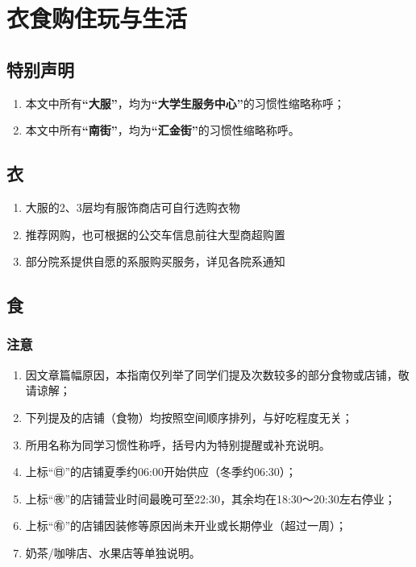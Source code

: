 \section[衣食购住玩与生活]{衣食购住玩与生活}

\subsection*{特别声明}
\begin{enumerate}
    \item 本文中所有\textbf{“大服”}，均为\textbf{“大学生服务中心”}的习惯性缩略称呼；
    \item 本文中所有\textbf{“南街”}，均为\textbf{“汇金街”}的习惯性缩略称呼。
\end{enumerate}
\subsection[衣]{衣}
\begin{enumerate}
    \item 大服的2、3层均有服饰商店可自行选购衣物
    \item 推荐网购，也可根据的公交车信息前往大型商超购置
    \item 部分院系提供自愿的系服购买服务，详见各院系通知
\end{enumerate}

\subsection[食]{食}
\subsubsection*{注意}
\begin{enumerate}
    \item 因文章篇幅原因，本指南仅列举了同学们提及次数较多的部分食物或店铺，敬请谅解；
    \item 下列提及的店铺（食物）均按照空间顺序排列，与好吃程度无关；
    \item 所用名称为同学习惯性称呼，括号内为特别提醒或补充说明。
    \item 上标“㊐”的店铺夏季约06:00开始供应（冬季约06:30）；
    \item 上标“㊰”的店铺营业时间最晚可至22:30，其余均在18:30～20:30左右停业；
    \item 上标“㊒”的店铺因装修等原因尚未开业或长期停业（超过一周）；
    \item 奶茶/咖啡店、水果店等单独说明。
\end{enumerate}

